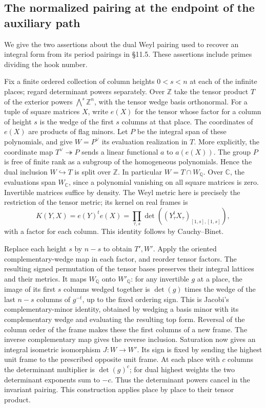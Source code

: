 \subsection{The normalized pairing at the endpoint of the auxiliary path}
\label{pathmath:dual}
We give the two assertions about the dual Weyl pairing used to recover an integral form from its period pairings in \S11.5. These assertions include primes dividing the hook number.

Fix a finite ordered collection of column heights $0<s<n$ at each of the infinite places; regard determinant powers separately. Over $\mathbb Z$ take the tensor product $T$ of the exterior powers $\bigwedge^s\mathbb Z^n$, with the tensor wedge basis orthonormal. For a tuple of square matrices $X$, write $e(X)$ for the tensor whose factor for a column of height $s$ is the wedge of the first $s$ columns at that place. The coordinates of $e(X)$ are products of flag minors. Let $P$ be the integral span of these polynomials, and give $W=P^\vee$ its evaluation realization in $T$. More explicitly, the coordinate map $T^\vee\twoheadrightarrow P$ sends a linear functional $a$ to $a(e(X))$. The group $P$ is free of finite rank as a subgroup of the homogeneous polynomials. Hence the dual inclusion $W\hookrightarrow T$ is split over $\mathbb Z$. In particular $W=T\cap W_{\mathbb Q}$. Over $\mathbb C$, the evaluations span $W_{\mathbb C}$, since a polynomial vanishing on all square matrices is zero. Invertible matrices suffice by density. The Weyl metric here is precisely the restriction of the tensor metric; its kernel on real frames is
\[
 K(Y,X)=e(Y)^t e(X)=\prod_{\tau,s}\det((Y_\tau^t X_\tau)_{[1,s],[1,s]}),
\]
with a factor for each column. This identity follows by Cauchy--Binet.

Replace each height $s$ by $n-s$ to obtain $T',W'$. Apply the oriented complementary-wedge map in each factor, and reorder tensor factors. The resulting signed permutation of the tensor bases preserves their integral lattices and their metrics. It maps $W_{\mathbb Q}$ onto $W'_{\mathbb Q}$: for any invertible $g$ at a place, the image of its first $s$ columns wedged together is $\det(g)$ times the wedge of the last $n-s$ columns of $g^{-t}$, up to the fixed ordering sign. This is Jacobi's complementary-minor identity, obtained by wedging a basis minor with its complementary wedge and evaluating the resulting top form. Reversal of the column order of the frame makes these the first columns of a new frame. The inverse complementary map gives the reverse inclusion. Saturation now gives an integral isometric isomorphism $J:W\to W'$. Its sign is fixed by sending the highest unit frame to the prescribed opposite unit frame. At each place with $c$ columns the determinant multiplier is $\det(g)^c$; for dual highest weights the two determinant exponents sum to $-c$. Thus the determinant powers cancel in the invariant pairing. This construction applies place by place to their tensor product.

